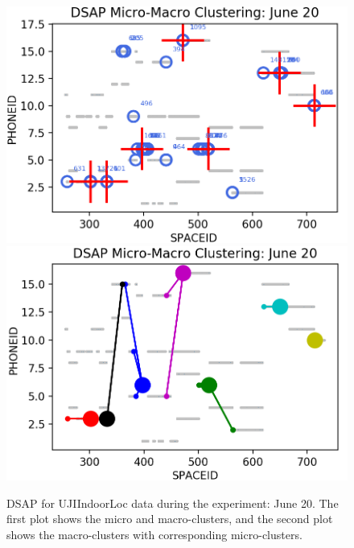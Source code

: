   
 
 








\begin{figure}[!ht]
    \centering
    \includegraphics[width=.6\textwidth]{image/Chapters/Chapter6/DSAPJune20.png}
    \includegraphics[width=.6\textwidth]{image/Chapters/Chapter6/DSAPJune20Macro.png}
    \\[\smallskipamount]    
    \caption{ DSAP for UJIIndoorLoc data during the experiment: June 20. The first plot shows the micro and macro-clusters, and the second plot shows the macro-clusters with corresponding micro-clusters.}
    \label{dsapjun20}
\end{figure}





